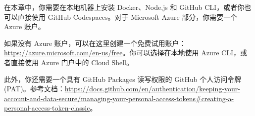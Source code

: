 在本章中，你需要在本地机器上安装 Docker、Node.js 和 GitHub CLI，或者你也可以直接使用 GitHub Codespaces。对于 Microsoft Azure 部分，你需要一个 Azure 账户。

如果没有 Azure 账户，可以在这里创建一个免费试用账户：\url{https://azure.microsoft.com/en-us/free}。你可以选择在本地使用 Azure CLI，或者直接使用 Azure 门户中的 Cloud Shell。

此外，你还需要一个具有 GitHub Packages 读写权限的 GitHub 个人访问令牌(PAT)。参考文档：\url{https://docs.github.com/en/authentication/keeping-your-account-and-data-secure/managing-your-personal-access-tokens#creating-a-personal-access-token-classic}。
